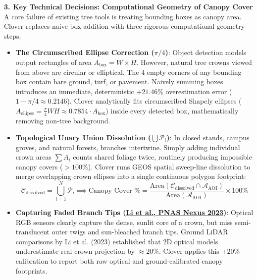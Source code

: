 \documentclass[10pt,a4paper]{article}
\begin{document}
\vspace{0.35em}
\noindent\textbf{\large 3. Key Technical Decisions: Computational Geometry of Canopy Cover}\\[0.25em]
A core failure of existing tree tools is treating bounding boxes as canopy area. Clover replaces naive box addition with three rigorous computational geometry steps:
\begin{itemize}
    \item \textbf{The Circumscribed Ellipse Correction ($\pi/4$)}: Object detection models output rectangles of area $A_{\text{box}} = W \times H$. However, natural tree crowns viewed from above are circular or elliptical. The 4 empty corners of any bounding box contain bare ground, turf, or pavement. Naively summing boxes introduces an immediate, deterministic $\mathbf{+21.46\%}$ overestimation error ($1 - \pi/4 \approx 0.2146$). Clover analytically fits circumscribed Shapely ellipses ($A_{\text{ellipse}} = \frac{\pi}{4} W H \approx 0.7854 \cdot A_{\text{box}}$) inside every detected box, mathematically removing non-tree background.
    \item \textbf{Topological Unary Union Dissolution ($\bigcup \mathcal{P}_i$)}: In closed stands, campus groves, and natural forests, branches intertwine. Simply adding individual crown areas $\sum A_i$ counts shared foliage twice, routinely producing impossible canopy covers ($>100\%$). Clover runs GEOS spatial sweep-line dissolution to merge overlapping crown ellipses into a single continuous polygon footprint:
    \begin{equation*}
    \mathcal{C}_{\text{dissolved}} = \bigcup_{i=1}^N \mathcal{P}_i \implies \text{Canopy Cover \%} = \frac{\text{Area}(\mathcal{C}_{\text{dissolved}} \cap \mathcal{A}_{\text{AOI}})}{\text{Area}(\mathcal{A}_{\text{AOI}})} \times 100\%
    \end{equation*}
    \item \textbf{Capturing Faded Branch Tips (\href{https://doi.org/10.1093/pnasnexus/pgad076}{Li et al., PNAS Nexus 2023})}: Optical RGB sensors clearly capture the dense, sunlit core of a crown, but miss semi-translucent outer twigs and sun-bleached branch tips. Ground LiDAR comparisons by Li et al. (2023) established that 2D optical models underestimate real crown projection by $\approx 20\%$. Clover applies this $+20\%$ calibration to report both raw optical and ground-calibrated canopy footprints.
\end{itemize}
\end{document}
